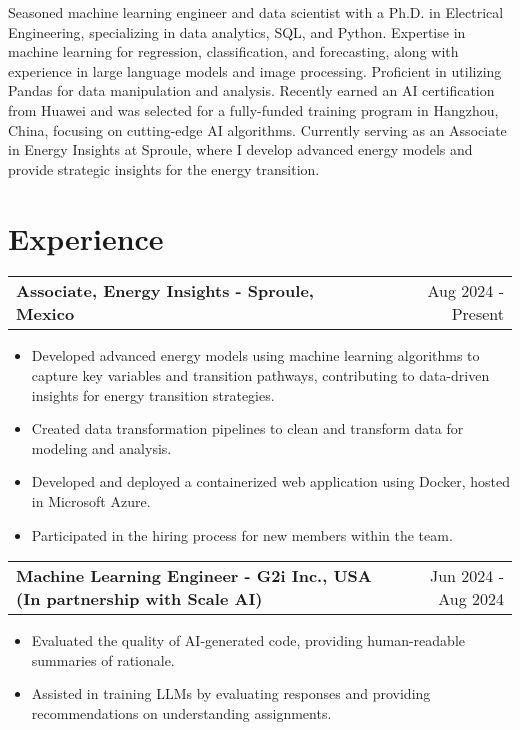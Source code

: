 \documentclass[a4paper,10pt]{article}
\makeatletter
\newenvironment{joblong}[2]
    {
    \begin{tabularx}{\linewidth}{@{}l X r@{}}
    \textbf{#1} & \hfill &  #2 \\[3.75pt]
    \end{tabularx}
    \begin{minipage}[t]{\linewidth}
    \begin{itemize}[nosep,after=\strut, leftmargin=1em, itemsep=3pt,label=--]
    }
    {
    \end{itemize}
    \end{minipage}    
    }
\makeatother
\begin{document}
Seasoned machine learning engineer and data scientist with a Ph.D. in Electrical Engineering, specializing in data analytics, SQL, and Python. Expertise in machine learning for regression, classification, and forecasting, along with experience in large language models and image processing. Proficient in utilizing Pandas for data manipulation and analysis. Recently earned an AI certification from Huawei and was selected for a fully-funded training program in Hangzhou, China, focusing on cutting-edge AI algorithms. Currently serving as an Associate in Energy Insights at Sproule, where I develop advanced energy models and provide strategic insights for the energy transition.

\section{Experience}

\begin{joblong}{Associate, Energy Insights - Sproule, Mexico}{Aug 2024 - Present}
    \item Developed advanced energy models using machine learning algorithms to capture key variables and transition pathways, contributing to data-driven insights for energy transition strategies.
    \item Created data transformation pipelines to clean and transform data for modeling and analysis.
    \item Developed and deployed a containerized web application using Docker, hosted in Microsoft Azure.
    \item Participated in the hiring process for new members within the team.
\end{joblong}

\begin{joblong}{Machine Learning Engineer - G2i Inc., USA (In partnership with Scale AI)}{Jun 2024 - Aug 2024}
    \item Evaluated the quality of AI-generated code, providing human-readable summaries of rationale.
    \item Assisted in training LLMs by evaluating responses and providing recommendations on understanding assignments.
\end{joblong}
\end{document}
